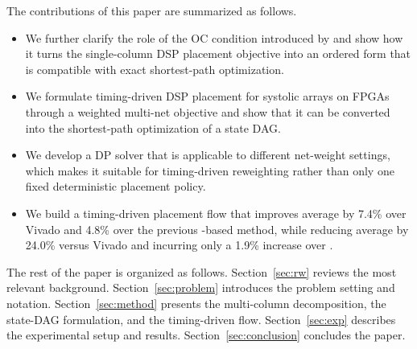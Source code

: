 The contributions of this paper are summarized as follows.
\begin{itemize}[leftmargin=*,topsep=2pt,itemsep=2pt]
\item We further clarify the role of the OC condition introduced by \rsad and show how it turns the single-column DSP placement objective into an ordered form that is compatible with exact shortest-path optimization.
\item We formulate timing-driven DSP placement for systolic arrays on FPGAs through a weighted multi-net objective and show that it can be converted into the shortest-path optimization of a state DAG.
\item We develop a DP solver that is applicable to different net-weight settings, which makes it suitable for timing-driven reweighting rather than only one fixed deterministic placement policy.
\item We build a timing-driven placement flow that improves average \fmax by 7.4\% over Vivado and 4.8\% over the previous \rsad-based method, while reducing average \hpwl by 24.0\% versus Vivado and incurring only a 1.9\% \hpwl increase over \rsad.
\end{itemize}

The rest of the paper is organized as follows. Section~\ref{sec:rw} reviews the most relevant background. Section~\ref{sec:problem} introduces the problem setting and notation. Section~\ref{sec:method} presents the multi-column decomposition, the state-DAG formulation, and the timing-driven flow. Section~\ref{sec:exp} describes the experimental setup and results. Section~\ref{sec:conclusion} concludes the paper.
